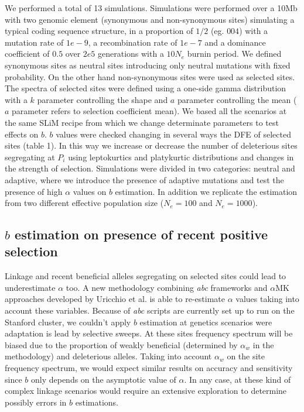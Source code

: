\documentclass[11pt]{article}
\begin{document}
We performed a total of 13 simulations. Simulations were performed over a 10Mb with two genomic element (synonymous and non-synonymous sites) simulating a typical coding sequence structure, in a proportion of ${1}/{2}$ (eg. $004$) with a mutation rate of $1e-9$, a recombination rate of $1e-7$ and a dominance coefficient of $0.5$ over $2e5$ generations with a $10N_{e}$ burnin  period. We defined synonymous sites as neutral sites introducing only neutral mutations with fixed probability. On the other hand non-synonymous sites were used as selected sites. The spectra of selected sites were defined using a one-side gamma distribution with a $k$ parameter controlling the shape and $a$ parameter controlling the mean ($a$ parameter refers to selection coefficient mean). We based all the scenarios at the same SLiM recipe from which we change determinate parameters to test effects on $b$. $b$ values were checked changing in several ways the DFE of selected sites (table 1). In this way we increase or decrease the number of deleterious sites segregating at $P_{i}$ using leptokurtics and platykurtic distributions and changes in the strength of selection. Simulations were divided in two categories: neutral and adaptive, where we introduce the presence of adaptive mutations and test the presence of high $\alpha$ values on $b$ estimation. In addition we replicate the estimation from two different effective population size ($N_{e} = 100$ and $N_{e} = 1000$).


\subsection{$b$  estimation on presence of recent positive selection}

Linkage and recent beneficial alleles segregating on selected sites could lead to underestimate $\alpha$ too. A new methodology combining \emph{abc} frameworks and $\alpha$MK approaches developed by Uricchio et al. is able to re-estimate $\alpha$ values taking into account these variables. Because of \emph{abc} scripts are currently set up to run on the Stanford cluster, we couldn't apply $b$ estimation at genetics scenarios were adaptation is lead by selective sweeps. At these sites frequency spectrum will be biased due to the proportion of weakly beneficial (determined by $\alpha_w$ in the methodology) and deleterious alleles. Taking into account $\alpha_w$ on the site frequency spectrum, we would expect similar results on accuracy and sensitivity since $b$ only depends on the asymptotic value of $\alpha$. In any case, at these kind of complex linkage scenarios would require an extensive exploration to determine possibly errors in $b$ estimations.




    
    
    
\end{document}
